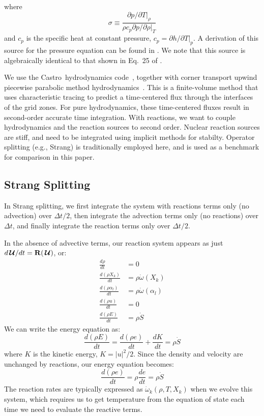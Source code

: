 \documentclass[times,modern]{aastex63}
\newcommand{\castro}{{\sf Castro}}
\newcommand{\omegadot}{\dot{\omega}}
\newcommand{\Sdot}{\dot{S}}
\newcommand{\odt}[1]{{\frac{{d#1}}{dt}}}
\newcommand{\Uc}{{\,\bm{\mathcal{U}}}}
\newcommand{\Rb}{{\bf R}}
\begin{document}
where
\begin{equation}
\sigma \equiv \frac{\partial p/\partial T |_\rho}{\rho c_p \partial p/\partial \rho |_T}
\end{equation}
and $c_p$ is the specific heat at constant pressure, $c_p = \partial
h/\partial T |_p$.  A derivation of this source for the pressure
equation can be found in \cite{ABNZ:III}.  We note that this source is
algebraically identical to that shown in Eq.~25 of \cite{castro}.



We use the \castro\ hydrodynamics code~\cite{castro}, together with
corner transport upwind piecewise parabolic method
hydrodynamics~\citep{millercolella:2002}.  This is a finite-volume
method that uses characteristic tracing to predict a time-centered
flux through the interfaces of the grid zones.  For pure
hydrodynamics, these time-centered fluxes result in second-order
accurate time integration.  With reactions, we want to couple
hydrodynamics and the reaction sources to second order.  Nuclear
reaction sources are stiff, and need to be integrated using implicit
methods for stabilty.  Operator splitting (e.g., Strang) is traditionally employed
here, and is used as a benchmark for comparison in this paper.



\subsection{Strang Splitting}

In Strang splitting, we first integrate the system with reactions terms only (no advection)
over $\Delta t/2$, then integrate the advection terms only (no reactions) over $\Delta t$,
and finally integrate the reaction terms only over $\Delta t/2$.

In the absence of advective terms, our reaction system appears as just
$d\Uc/dt = \Rb(\Uc)$, or:
\begin{align}
\odt{\rho} & = 0 \\
\odt{(\rho X_k)} &= \rho \omegadot(X_k) \\
\odt{(\rho \alpha_l)} &= \rho \omegadot(\alpha_l) \\
\odt{(\rho u)} &= 0 \\
\odt{(\rho E)} &= \rho \Sdot
\end{align}
We can write the energy equation as:
\begin{equation}
\odt{(\rho E)} = \odt{(\rho e)} + \odt{K} = \rho \Sdot
\end{equation}
where $K$ is the kinetic energy, $K = |u|^2/2$.  Since the density and velocity
are unchanged by reactions, our energy equation becomes:
\begin{equation}
\label{eq:strang:e}
\odt{(\rho e)} = \rho \odt{e} = \rho \Sdot
\end{equation}
The reaction rates are typically expressed as $\omegadot_k(\rho, T, X_k)$
when we evolve this system, which requires us to get temperature from
the equation of state each
time we need to evaluate the reactive terms.  
\end{document}
